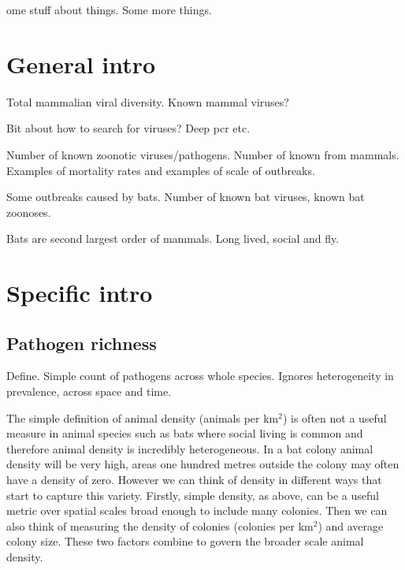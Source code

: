 

ome stuff about things. Some more things.  \blindtext

\section{General intro}

Total mammalian viral diversity.
Known mammal viruses?

Bit about how to search for viruses? Deep pcr etc.



Number of known zoonotic viruses/pathogens.
Number of known from mammals.
Examples of mortality rates and examples of scale of outbreaks.


Some outbreaks caused by bats.
Number of known bat viruses, known bat zoonoses.

Bats are second largest order of mammals.
Long lived, social and fly.


\section{Specific  intro}
\subsection{Pathogen richness}

Define.
Simple count of pathogens across whole species.
Ignores heterogeneity in prevalence, across space and time.







The simple definition of animal density (animals per km$^2$) is often not a useful measure in animal species such as bats where social living is common and therefore animal density is incredibly heterogeneous.
In a bat colony animal density will be very high, areas one hundred metres outside the colony may often have a density of zero.
However we can think of density in different ways that start to capture this variety.
Firstly, simple density, as above, can be a useful metric over spatial scales broad enough to include many colonies.
Then we can also think of measuring the density of colonies (colonies per km$^2$) and average colony size.
These two factors combine to govern the broader scale animal density.

